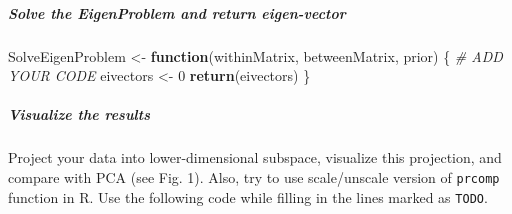 \documentclass[]{article}
\newenvironment{Shaded}{\begin{snugshade}}{\end{snugshade}}
\newcommand{\CommentTok}[1]{\textcolor[rgb]{0.56,0.35,0.01}{\textit{#1}}}
\newcommand{\ControlFlowTok}[1]{\textcolor[rgb]{0.13,0.29,0.53}{\textbf{#1}}}
\newcommand{\DecValTok}[1]{\textcolor[rgb]{0.00,0.00,0.81}{#1}}
\newcommand{\KeywordTok}[1]{\textcolor[rgb]{0.13,0.29,0.53}{\textbf{#1}}}
\newcommand{\NormalTok}[1]{#1}
\newcommand{\StringTok}[1]{\textcolor[rgb]{0.31,0.60,0.02}{#1}}
\let\oldsubparagraph\subparagraph
\renewcommand{\subparagraph}[1]{\oldsubparagraph{#1}\mbox{}}
\begin{document}
\hypertarget{solve-the-eigenproblem-and-return-eigen-vector}{%
\subparagraph{Solve the EigenProblem and return
eigen-vector}\label{solve-the-eigenproblem-and-return-eigen-vector}}

\begin{Shaded}
\begin{Highlighting}[]
\NormalTok{SolveEigenProblem <-}\StringTok{ }\ControlFlowTok{function}\NormalTok{(withinMatrix, betweenMatrix, prior)}
\NormalTok{\{}
  \CommentTok{# ADD YOUR CODE}
\NormalTok{  eivectors <-}\StringTok{ }\DecValTok{0}
  \KeywordTok{return}\NormalTok{(eivectors)}
\NormalTok{\}}
\end{Highlighting}
\end{Shaded}

\hypertarget{visualize-the-results}{%
\subparagraph{Visualize the results}\label{visualize-the-results}}

Project your data into lower-dimensional subspace, visualize this
projection, and compare with PCA (see Fig. 1). Also, try to use
scale/unscale version of \texttt{prcomp} function in R. Use the
following code while filling in the lines marked as \texttt{TODO}.
\end{document}
